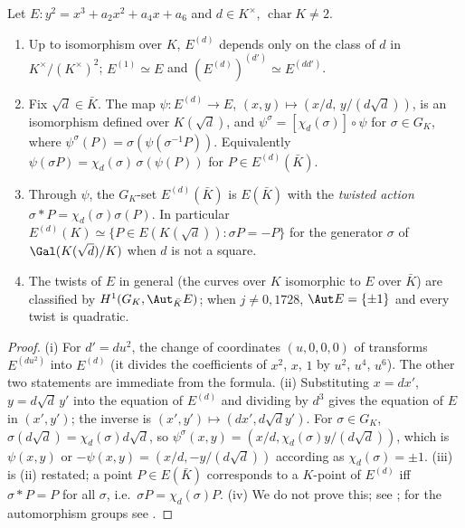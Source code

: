 \begin{proposition}\label{prop:ellcurves:twistbasic}
Let $E\colon y^2=x^3+a_2x^2+a_4x+a_6$ and $d\in K^\times$, $\operatorname{char}K\ne2$.
\begin{enumerate}[label=(\roman*)]
\item Up to isomorphism over $K$, $E^{(d)}$ depends only on the class of $d$ in $K^\times/(K^\times)^2$; $E^{(1)}\simeq E$ and $(E^{(d)})^{(d')}\simeq E^{(dd')}$.
\item Fix $\sqrt d\in\bar K$. The map $\psi\colon E^{(d)}\to E$, $(x,y)\mapsto(x/d,\,y/(d\sqrt d))$, is an isomorphism defined over $K(\sqrt d)$, and $\psi^\sigma=[\chi_d(\sigma)]\circ\psi$ for
$\sigma\in G_K$, where $\psi^\sigma(P)=\sigma(\psi(\sigma^{-1}P))$. Equivalently $\psi(\sigma P)=\chi_d(\sigma)\,\sigma(\psi(P))$ for $P\in E^{(d)}(\bar K)$.
\item Through $\psi$, the $G_K$-set $E^{(d)}(\bar K)$ is $E(\bar K)$ with the \emph{twisted action} $\sigma*P=\chi_d(\sigma)\sigma(P)$. In particular $E^{(d)}(K)\simeq\{P\in E(K(\sqrt d)):\sigma P=-P\}$ for
the generator $\sigma$ of $\Gal(K(\sqrt d)/K)$ when $d$ is not a square.
\item The twists of $E$ in general (the curves over $K$ isomorphic to $E$ over $\bar K$) are classified by $H^1(G_K,\Aut_{\bar K}E)$; when $j\ne0,1728$, $\Aut E=\{\pm1\}$ and every twist is quadratic.
\end{enumerate}
\end{proposition}

\begin{proof}
(i) For $d'=du^2$, the change of coordinates $(u,0,0,0)$ of  transforms $E^{(du^2)}$ into $E^{(d)}$ (it divides the coefficients of $x^2$, $x$, $1$ by $u^2$, $u^4$,
$u^6$). The other two statements are immediate from the formula. (ii) Substituting $x=dx'$, $y=d\sqrt d\,y'$ into the equation of $E^{(d)}$ and dividing by $d^3$ gives the equation of $E$
in $(x',y')$; the inverse is $(x',y')\mapsto(dx',d\sqrt dy')$. For $\sigma\in G_K$, $\sigma(d\sqrt d)=\chi_d(\sigma)d\sqrt d$, so $\psi^\sigma(x,y)=(x/d,\chi_d(\sigma)y/(d\sqrt d))$, which is
$\psi(x,y)$ or $-\psi(x,y)=(x/d,-y/(d\sqrt d))$ according as $\chi_d(\sigma)=\pm1$. (iii) is (ii) restated; a point $P\in E(\bar K)$ corresponds to a $K$-point of $E^{(d)}$ iff $\sigma*P=P$ for all
$\sigma$, i.e.\ $\sigma P=\chi_d(\sigma)P$. (iv) We do not prove this; see \cite[Sections X.2 and X.5]{SilvermanAEC}; for the automorphism groups see .
\end{proof}

